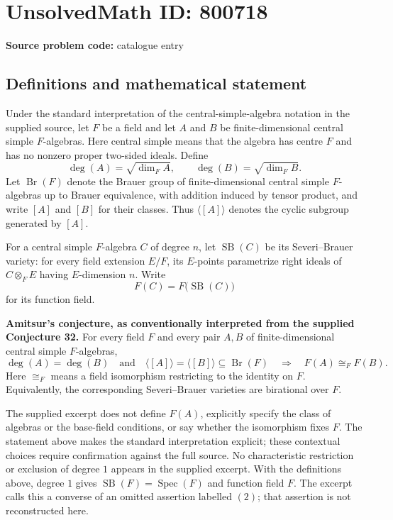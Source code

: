 \documentclass[11pt]{article}
\begin{document}
\section*{UnsolvedMath ID: 800718}
\textbf{Source problem code:} catalogue entry
\subsection{Definitions and mathematical statement}
Under the standard interpretation of the central-simple-algebra notation in the supplied source, let \(F\) be a field and let \(A\) and \(B\) be finite-dimensional central simple \(F\)-algebras. Here central simple means that the algebra has centre \(F\) and has no nonzero proper two-sided ideals. Define
\[
\deg(A)=\sqrt{\dim_F A},\qquad \deg(B)=\sqrt{\dim_F B}.
\]
Let \(\operatorname{Br}(F)\) denote the Brauer group of finite-dimensional central simple \(F\)-algebras up to Brauer equivalence, with addition induced by tensor product, and write \([A]\) and \([B]\) for their classes. Thus \(\langle[A]\rangle\) denotes the cyclic subgroup generated by \([A]\).

For a central simple \(F\)-algebra \(C\) of degree \(n\), let \(\operatorname{SB}(C)\) be its Severi--Brauer variety: for every field extension \(E/F\), its \(E\)-points parametrize right ideals of \(C\otimes_F E\) having \(E\)-dimension \(n\). Write
\[
F(C)=F\bigl(\operatorname{SB}(C)\bigr)
\]
for its function field.

\textbf{Amitsur's conjecture, as conventionally interpreted from the supplied Conjecture 32.} For every field \(F\) and every pair \(A,B\) of finite-dimensional central simple \(F\)-algebras,
\[
\deg(A)=\deg(B)
\quad\text{and}\quad
\langle[A]\rangle=\langle[B]\rangle\subseteq\operatorname{Br}(F)
\quad\Longrightarrow\quad
F(A)\cong_F F(B).
\]
Here \(\cong_F\) means a field isomorphism restricting to the identity on \(F\). Equivalently, the corresponding Severi--Brauer varieties are birational over \(F\).

The supplied excerpt does not define \(F(A)\), explicitly specify the class of algebras or the base-field conditions, or say whether the isomorphism fixes \(F\). The statement above makes the standard interpretation explicit; these contextual choices require confirmation against the full source. No characteristic restriction or exclusion of degree \(1\) appears in the supplied excerpt. With the definitions above, degree \(1\) gives \(\operatorname{SB}(F)=\operatorname{Spec}(F)\) and function field \(F\). The excerpt calls this a converse of an omitted assertion labelled \((2)\); that assertion is not reconstructed here.
\end{document}
